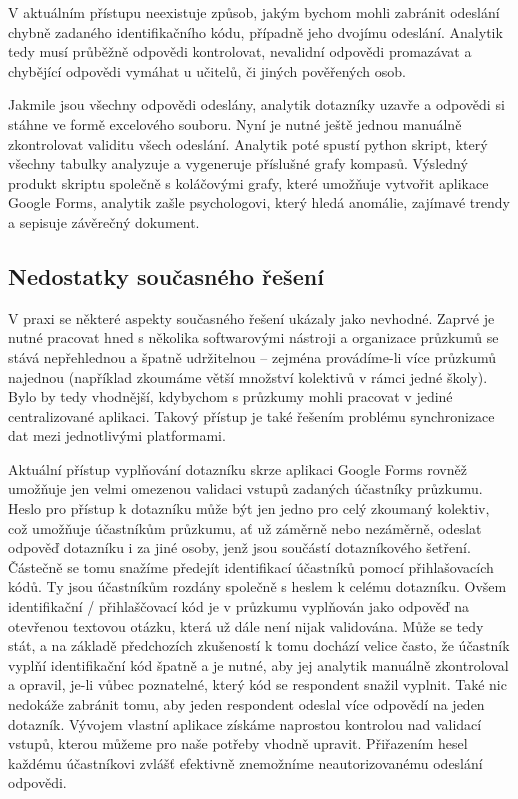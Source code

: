 V aktuálním přístupu neexistuje způsob, jakým bychom mohli zabránit odeslání chybně zadaného identifikačního kódu, případně jeho dvojímu odeslání. Analytik tedy musí průběžně odpovědi kontrolovat, nevalidní odpovědi promazávat a chybějící odpovědi vymáhat u učitelů, či jiných pověřených osob.

Jakmile jsou všechny odpovědi odeslány, analytik dotazníky uzavře a odpovědi si stáhne ve formě excelového souboru. Nyní je nutné ještě jednou manuálně zkontrolovat validitu všech odeslání. Analytik poté spustí python skript, který všechny tabulky analyzuje a vygeneruje příslušné grafy kompasů. Výsledný produkt skriptu společně s koláčovými grafy, které umožňuje vytvořit aplikace Google Forms, analytik zašle psychologovi, který hledá anomálie, zajímavé trendy a sepisuje závěrečný dokument.

\subsection{Nedostatky současného řešení}
V praxi se některé aspekty současného řešení ukázaly jako nevhodné. Zaprvé je nutné pracovat hned s několika softwarovými nástroji a organizace průzkumů se stává nepřehlednou a špatně udržitelnou – zejména provádíme-li více průzkumů najednou (například zkoumáme větší množství kolektivů v rámci jedné školy). Bylo by tedy vhodnější, kdybychom s průzkumy mohli pracovat v jediné centralizované aplikaci. Takový přístup je také řešením problému synchronizace dat mezi jednotlivými platformami.

Aktuální přístup vyplňování dotazníku skrze aplikaci Google Forms rovněž umožňuje jen velmi omezenou validaci vstupů zadaných účastníky průzkumu. Heslo pro přístup k dotazníku může být jen jedno pro celý zkoumaný kolektiv, což umožňuje účastníkům průzkumu, ať už záměrně nebo nezáměrně, odeslat odpověď dotazníku i za jiné osoby, jenž jsou součástí dotazníkového šetření. Částečně se tomu snažíme předejít identifikací účastníků pomocí přihlašovacích kódů. Ty jsou účastníkům rozdány společně s heslem k celému dotazníku. Ovšem identifikační / přihlaščovací kód je v průzkumu vyplňován jako odpověď na otevřenou textovou otázku, která už dále není nijak validována. Může se tedy stát, a na základě předchozích zkušeností k tomu dochází velice často, že účastník vyplňí identifikační kód špatně a je nutné, aby jej analytik manuálně zkontroloval a opravil, je-li vůbec poznatelné, který kód se respondent snažil vyplnit. Také nic nedokáže zabránit tomu, aby jeden respondent odeslal více odpovědí na jeden dotazník. Vývojem vlastní aplikace získáme naprostou kontrolou nad validací vstupů, kterou můžeme pro naše potřeby vhodně upravit. Přiřazením hesel každému účastníkovi zvlášť efektivně znemožníme neautorizovanému odeslání odpovědi.

